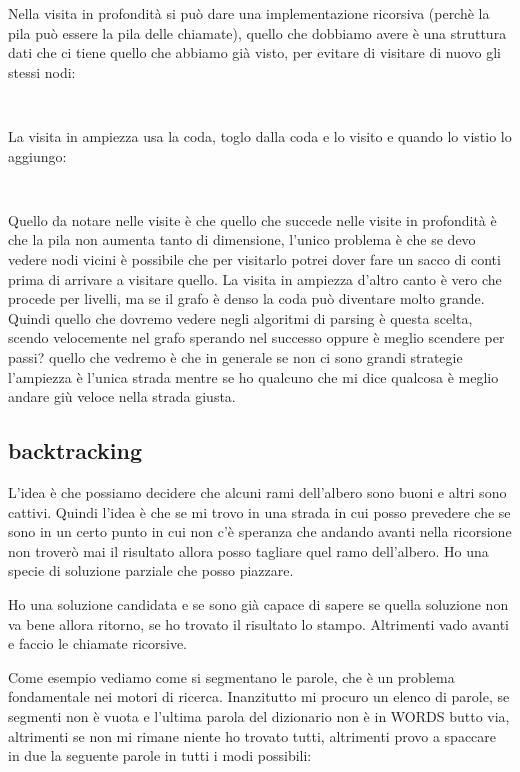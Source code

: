 Nella visita in profondità si può dare una implementazione ricorsiva (perchè la pila può essere la pila delle chiamate), quello che dobbiamo avere è una struttura dati che ci tiene quello che abbiamo già visto, per evitare di visitare di nuovo gli stessi nodi:
\begin{lstlisting}
    
\end{lstlisting}

La visita in ampiezza usa la coda, toglo dalla coda e lo visito e quando lo vistio lo aggiungo:
\begin{lstlisting}
    
\end{lstlisting}

Quello da notare nelle visite è che quello che succede nelle visite in profondità è che la pila non aumenta tanto di dimensione, l'unico problema è che se devo vedere nodi vicini è possibile che per visitarlo potrei dover fare un sacco di conti prima di arrivare a visitare quello. 
La visita in ampiezza d'altro canto è vero che procede per livelli, ma se il grafo è denso la coda può diventare molto grande. Quindi quello che dovremo vedere negli algoritmi di parsing è questa scelta, scendo velocemente nel grafo sperando nel successo oppure è meglio scendere per passi? quello che vedremo è che in generale se non ci sono grandi strategie l'ampiezza è l'unica strada mentre se ho qualcuno che mi dice qualcosa è meglio andare giù veloce nella strada giusta.

\subsection{backtracking}
L'idea è che possiamo decidere che alcuni rami dell'albero sono buoni e altri sono cattivi. Quindi l'idea è che se mi trovo in una strada in cui posso prevedere che se sono in un certo punto in cui non c'è speranza che andando avanti nella ricorsione non troverò mai il risultato allora posso tagliare quel ramo dell'albero. Ho una specie di soluzione parziale che posso piazzare.

Ho una soluzione candidata e se sono già capace di sapere se quella soluzione non va bene allora ritorno, se ho trovato il risultato lo stampo. Altrimenti vado avanti e faccio le chiamate ricorsive.

Come esempio vediamo come si segmentano le parole, che è un problema fondamentale nei motori di ricerca. Inanzitutto mi procuro un elenco di parole, se segmenti non è vuota e l'ultima parola del dizionario non è in WORDS butto via, altrimenti se non mi rimane niente ho trovato tutti, altrimenti provo a spaccare in due la seguente parole in tutti i modi possibili:
\begin{lstlisting}
    
\end{lstlisting}
